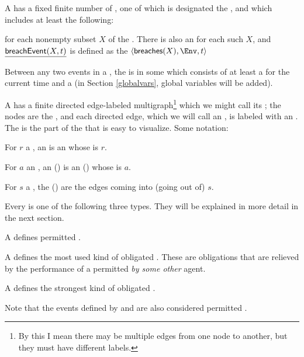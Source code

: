 \documentclass[12pt]{article}
\begin{document}
A \Contract has a fixed finite number of , one of which is designated the , and which includes at least the following:
\begin{LPPI}
\item {}
\item {} for each nonempty subset $X$ of the \Roles. There is also an \Action {} for each such $X$, and $\underline{\textsf{breachEvent}(X,t)}$ is defined as the \Event $\tup{\breaches{X}, \Env, t}$
\end{LPPI}
Between any two events in a \trace, the \Contract is in some  which consists of at least a \TimeStamp for the current time and a \State (in Section \ref{globalvars}, global variables will be added).

\medskip

A \Contract has a finite directed edge-labeled multigraph\footnote{By this I mean there may be multiple edges from one node to another, but they must have different labels.} which we might call its ; the nodes are the \States, and each directed edge, which we will call an , is labeled with an \Action. The \skeleton is the part of the \Contract that is easy to visualize. Some notation:

\newcommand{\atransition}{an \transition}

\begin{LPPI}
\item For $r$ a \Role, an  is \atransition whose \Role is $r$.
\item For $a$ an \Action, an  () is an \Event (\transition) whose \Action is $a$.
\item For $s$ a \State, the  () are the edges coming into (going out of) $s$.
\end{LPPI}
Every \transition is one of the following three types. They will be explained in more detail in the next section.
\begin{LPPI}
\item A  defines permitted \Events.
\item A  defines the most used kind of obligated \Events. These are obligations that are relieved by the performance of a permitted {\Event} {\it by some other} agent.
\item A  defines the strongest kind of obligated \Events.
\end{LPPI}
Note that the events defined by \rmustntrans and \mustntrans are also considered permitted \Events.
\end{document}
